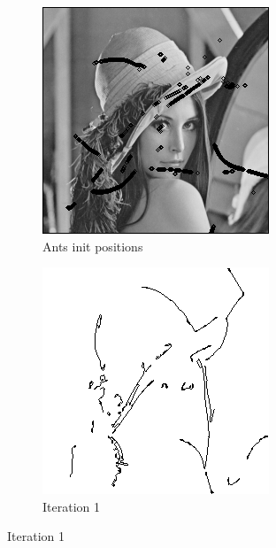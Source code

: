 \documentclass{llncs}
\begin{document}
	\begin{figure}
        \centering
        \begin{subfigure}[b]{0.3\textwidth}
                \includegraphics[width=\textwidth]{IMG/HeuristicInit/Initialization}
                \caption{Ants init positions}
                \label{fig:heu_init}
        \end{subfigure}%
        \qquad
        \begin{subfigure}[b]{0.3\textwidth}
                \includegraphics[width=\textwidth]{IMG/HeuristicInit/Iteration1}
                \caption{Iteration 1}
                \label{fig:heu_iter1}
        \end{subfigure}
        

\end{figure}
\end{document}
